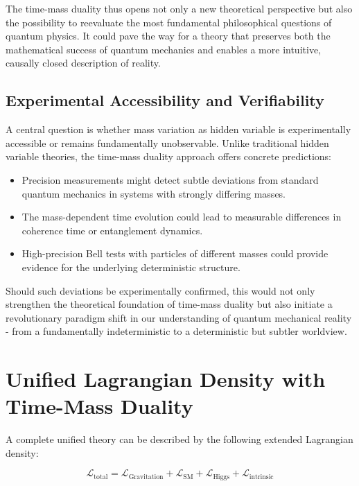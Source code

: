 \documentclass[12pt,a4paper]{article}  %
\begin{document}
	The time-mass duality thus opens not only a new theoretical perspective but also the possibility to reevaluate the most fundamental philosophical questions of quantum physics. It could pave the way for a theory that preserves both the mathematical success of quantum mechanics and enables a more intuitive, causally closed description of reality.
	
	\subsection{Experimental Accessibility and Verifiability}
	
	A central question is whether mass variation as hidden variable is experimentally accessible or remains fundamentally unobservable. Unlike traditional hidden variable theories, the time-mass duality approach offers concrete predictions:
	
	\begin{itemize}
		\item Precision measurements might detect subtle deviations from standard quantum mechanics in systems with strongly differing masses.
		
		\item The mass-dependent time evolution could lead to measurable differences in coherence time or entanglement dynamics.
		
		\item High-precision Bell tests with particles of different masses could provide evidence for the underlying deterministic structure.
	\end{itemize}
	
	Should such deviations be experimentally confirmed, this would not only strengthen the theoretical foundation of time-mass duality but also initiate a revolutionary paradigm shift in our understanding of quantum mechanical reality - from a fundamentally indeterministic to a deterministic but subtler worldview.
	
	\section{Unified Lagrangian Density with Time-Mass Duality}
	
	A complete unified theory can be described by the following extended Lagrangian density:
	
	\begin{equation}
		\mathcal{L}_\text{total} = \mathcal{L}_\text{Gravitation} + \mathcal{L}_\text{SM} + \mathcal{L}_\text{Higgs} + \mathcal{L}_\text{intrinsic}
	\end{equation}
	
\end{document}
